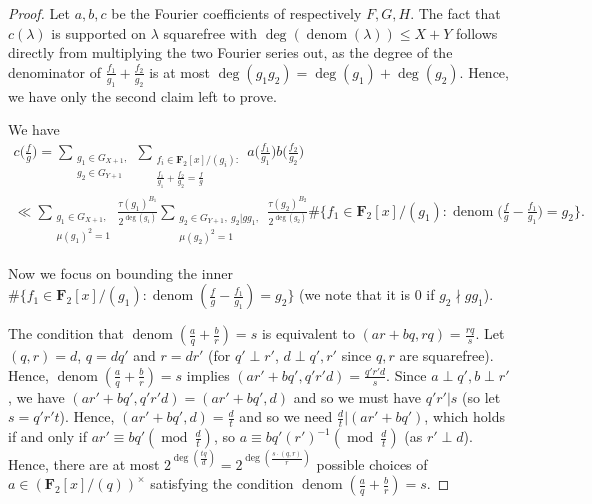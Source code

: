 \documentclass[11pt, reqno]{amsart}
\numberwithin{equation}{section}
\newcommand{\zff}{\mathbf{F}_2[x]}
\newcommand{\zffmi}[1]{(\zff/(#1))^{\times}}
\newcommand\denom{\operatorname{denom}}
\newcommand\modd{\operatorname{mod}}
\begin{document}
\begin{proof}
    Let $a, b, c$ be the Fourier coefficients of respectively $F, G, H$. The fact that $c(\lambda)$ is supported on $\lambda$ squarefree with $\deg(\denom(\lambda)) \leqslant X + Y$ follows directly from multiplying the two Fourier series out, as the degree of the denominator of $\frac{f_1}{g_1}+\frac{f_2}{g_2}$ is at most $\deg(g_1g_2)=\deg(g_1)+\deg(g_2)$. Hence, we have only the second claim left to prove.

    We have 
    \begin{multline*}
        c\Big(\frac{f}{g}\Big)=\sum_{\substack{g_1 \in G_{X+1},\\ g_2 \in G_{Y+1}}} \sum_{\substack{f_i \in \zff / (g_i): \\ \frac{f_1}{g_1}+\frac{f_2}{g_2} = \frac{f}{g}}} a\Big(\frac{f_1}{g_1}\Big)b\Big(\frac{f_2}{g_2}\Big) \\
        \ll \sum_{\substack{g_1 \in G_{X+1}, \\ \mu(g_1)^2=1}} \frac{\tau(g_1)^{B_1}}{2^{\deg(g_1)}} \sum_{\substack{g_2 \in G_{Y+1}, \ g_2 | gg_1, \\ \mu(g_2)^2=1}} \frac{\tau(g_2)^{B_2}}{2^{\deg(g_2)}} \#\{f_1 \in \zff / (g_1) : \denom\Big(\frac{f}{g}-\frac{f_1}{g_1}\Big)=g_2\}.
    \end{multline*}

    Now we focus on bounding the inner $\#\{f_1 \in \zff / (g_1) : \denom(\frac{f}{g}-\frac{f_1}{g_1})=g_2\}$ (we note that it is $0$ if $g_2 \nmid gg_1$).

    The condition that $\denom(\frac{a}{q}+\frac{b}{r})=s$ is equivalent to $(ar+bq, rq)=\frac{rq}{s}$. Let $(q, r)=d$, $q=dq'$ and $r=dr'$ (for $q' \perp r'$, $d \perp q', r'$ since $q, r$ are squarefree). Hence, $\denom(\frac{a}{q}+\frac{b}{r})=s$ implies $(ar'+bq', q'r'd)=\frac{q'r'd}{s}$. Since $a \perp q', b \perp r'$, we have $(ar'+bq', q'r'd)=(ar'+bq', d)$ and so we must have $q'r'|s$ (so let $s=q'r't$). Hence, $(ar'+bq', d)=\frac{d}{t}$ and so we need $\frac{d}{t} | (ar'+bq')$, which holds if and only if $ar' \equiv bq' (\modd \ \frac{d}{t})$, so $a \equiv bq'(r')^{-1} (\modd \ \frac{d}{t})$ (as $r' \perp d$). Hence, there are at most $2^{\deg(\frac{tq}{d})}=2^{\deg(\frac{s \cdot (q, r)}{r})}$ possible choices of $a \in \zffmi{q}$ satisfying the condition $\denom(\frac{a}{q}+\frac{b}{r})=s$.


\end{proof}
\end{document}
